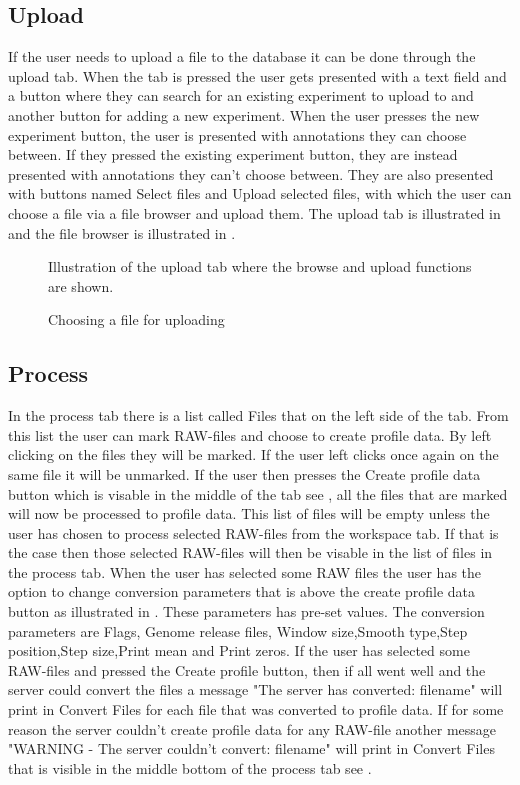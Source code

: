 \subsection{Upload}
If the user needs to upload a file to the database it can be done through the upload tab.
When the tab is pressed the user gets presented with a text field and a button where they can search for an existing experiment to upload to and another button for adding a new experiment. When the user presses the new experiment button, the user is presented with annotations they can choose between. If they pressed the existing experiment button, they are instead presented with annotations they can't choose between. They are also presented with buttons named Select files and Upload selected files, with which the user can choose a file via a file browser and upload them. The upload tab is illustrated in  and the file browser is illustrated in .
\begin{figure}[htb]
	\caption{Illustration of the upload tab where the browse and upload functions are shown.}
	\label{fig:des_upload-view}
\end{figure}

\begin{figure}[htb]
	\caption{Choosing a file for uploading}
	\label{fig:des_upload}
\end{figure}
\FloatBarrier

\subsection{Process}
In the process tab there is a list called Files that on the left side of the tab. From this list the user can mark RAW-files and choose to create profile data. By left clicking on the files they will be marked. If the user left clicks once again on the same file it will be unmarked. If the user then presses the Create profile data button which is visable in the middle of the tab see , all the files that are marked will now be processed to profile data. This list of files will be empty unless the user has chosen to process selected RAW-files from the workspace tab. If that is the case then those selected RAW-files will then be visable in the list of files in the process tab. When the user has selected some RAW files the user has the option to change conversion parameters that is above the create profile data button as illustrated in . These parameters has pre-set values. The conversion parameters are Flags, Genome release files, Window size,Smooth type,Step position,Step size,Print mean and Print zeros. If the user has selected some RAW-files and pressed the Create profile button, then if all went well and the server could convert the files a message "The server has converted: filename" will print in Convert Files for each file that was converted to profile data. If for some reason the server couldn't create profile data for any RAW-file another message "WARNING - The server couldn't convert: filename" will print in Convert Files that is visible in the middle bottom of the process tab see .


